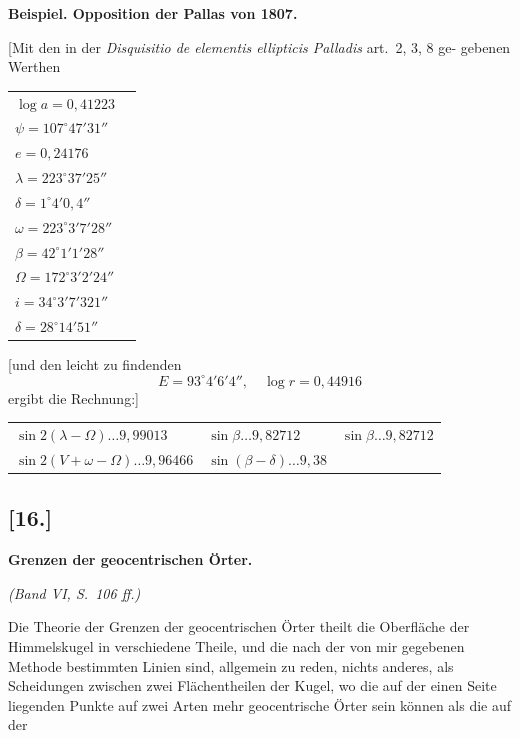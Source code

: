 \documentclass[12pt,a4paper]{article}
\begin{document}
\newpage

\textbf{Beispiel. Opposition der Pallas von 1807.}

[Mit den in der \textit{Disquisitio de elementis ellipticis Palladis} art.~2, 3, 8 ge-
gebenen Werthen
\begin{center}
\begin{tabular}{ll}
$\log a = 0{,}41223$ & \\
$\psi = 107^\circ 47' 31''$ & \\
$e = 0{,}24176$ & \\
$\lambda = 223^\circ 37' 25''$ & \\
$\delta = 1^\circ 4' 0{,}4''$ & \\
$\omega = 223^\circ 3' 7' 28''$ & \\
$\beta = 42^\circ 1' 1' 28''$ & \\
$\Omega = 172^\circ 3' 2' 24''$ & \\
$i = 34^\circ 3' 7' 321''$ & \\
$\delta = 28^\circ 14' 51''$ &
\end{tabular}
\end{center}
[und den leicht zu findenden
\[
E = 93^\circ 4' 6' 4'', \quad \log r = 0{,}44916
\]
ergibt die Rechnung:]

\begin{center}
\begin{tabular}{lll}
$\sin 2(\lambda - \Omega) \ldots 9{,}99013$ & $\sin\beta \ldots 9{,}82712$ & $\sin\beta \ldots 9{,}82712$ \\
$\sin 2(V + \omega - \Omega) \ldots 9{,}96466$ & $\sin(\beta - \delta) \ldots 9{,}38$ & 
\end{tabular}
\end{center}

\newpage

\subsection*{[16.]}
\textbf{Grenzen der geocentrischen \"Orter.}

\textit{(Band VI, S.~106 ff.)}

Die Theorie der Grenzen der geocentrischen \"Orter theilt die Oberfl\"ache
der Himmelskugel in verschiedene Theile, und die nach der von mir gegebenen
Methode bestimmten Linien sind, allgemein zu reden, nichts anderes, als Scheidungen
zwischen zwei Fl\"achentheilen der Kugel, wo die auf der einen Seite liegenden
Punkte auf zwei Arten mehr geocentrische \"Orter sein k\"onnen als die auf der
\end{document}
